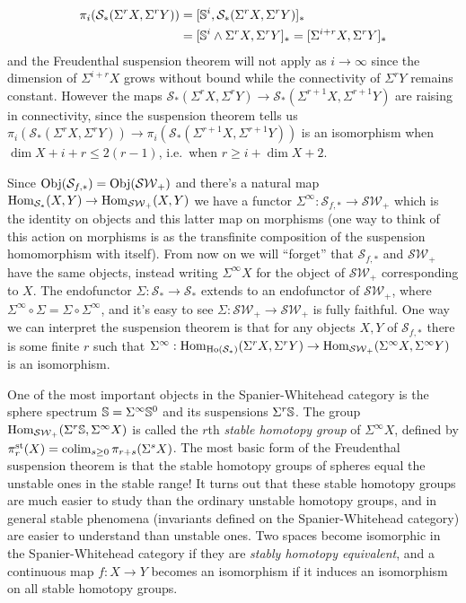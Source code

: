 \begin{align*}
\pi_i(\mathcal{S}_*(\Sigma^r X, \Sigma^r Y)) &= [\S^i, \mathcal{S}_*(\Sigma^r X, \Sigma^r Y)]_* \\
&= [\S^i \wedge \Sigma^r X, \Sigma^r Y]_* = [\Sigma^{i+r} X, \Sigma^r Y]_*
\end{align*}
and the Freudenthal suspension theorem will not apply as \(i \to \infty\) since the dimension of \(\Sigma^{i+r} X\) grows without bound while the connectivity of \(\Sigma^r Y\) remains constant. However the maps \(\mathcal{S}_*(\Sigma^r X, \Sigma^r Y) \to \mathcal{S}_*(\Sigma^{r+1} X, \Sigma^{r+1} Y)\) are raising in connectivity, since the suspension theorem tells us \(\pi_i(\mathcal{S}_*(\Sigma^r X, \Sigma^r Y)) \to \pi_i(\mathcal{S}_*(\Sigma^{r+1} X, \Sigma^{r+1} Y))\) is an isomorphism when \(\dim X + i + r \leq 2(r - 1)\), i.e.~when \(r \geq i + \dim X + 2\).

Since \(\Obj(\mathcal{S}_{f,*}) = \Obj(\mathcal{SW}_+)\) and there's a natural map \(\Hom_{\mathcal{S}_*}(X, Y) \to \Hom_{\mathcal{SW}_+}(X, Y)\) we have a functor \(\Sigma^\infty : \mathcal{S}_{f,*} \to \mathcal{SW}_+\) which is the identity on objects and this latter map on morphisms (one way to think of this action on morphisms is as the transfinite composition of the suspension homomorphism with itself). From now on we will ``forget'' that \(\mathcal{S}_{f,*}\) and \(\mathcal{SW}_+\) have the same objects, instead writing \(\Sigma^\infty X\) for the object of \(\mathcal{SW}_+\) corresponding to \(X\). The endofunctor \(\Sigma : \mathcal{S}_* \to \mathcal{S}_*\) extends to an endofunctor of \(\mathcal{SW}_+\), where \(\Sigma^\infty \circ \Sigma = \Sigma \circ \Sigma^\infty\), and it's easy to see \(\Sigma : \mathcal{SW}_+ \to \mathcal{SW}_+\) is fully faithful. One way we can interpret the suspension theorem is that for any objects \(X, Y\) of \(\mathcal{S}_{f,*}\) there is some finite \(r\) such that \(\Sigma^\infty : \Hom_{\Ho(\mathcal{S}_*)}(\Sigma^r X, \Sigma^r Y) \to \Hom_{\mathcal{SW}_+}(\Sigma^\infty X, \Sigma^\infty Y)\) is an isomorphism.

One of the most important objects in the Spanier-Whitehead category is the sphere spectrum \(\S = \Sigma^\infty \S^0\) and its suspensions \(\Sigma^r \S\). The group \(\Hom_{\mathcal{SW}_+}(\Sigma^r \S, \Sigma^\infty X)\) is called the \(r\)th \emph{stable homotopy group} of \(\Sigma^\infty X\), defined by \(\pi^{\mathrm{st}}_r(X) = \colim_{s \geq 0} \pi_{r+s}(\Sigma^s X)\). The most basic form of the Freudenthal suspension theorem is that the stable homotopy groups of spheres equal the unstable ones in the stable range! It turns out that these stable homotopy groups are much easier to study than the ordinary unstable homotopy groups, and in general stable phenomena (invariants defined on the Spanier-Whitehead category) are easier to understand than unstable ones. Two spaces become isomorphic in the Spanier-Whitehead category if they are \emph{stably homotopy equivalent}, and a continuous map \(f : X \to Y\) becomes an isomorphism if it induces an isomorphism on all stable homotopy groups.

